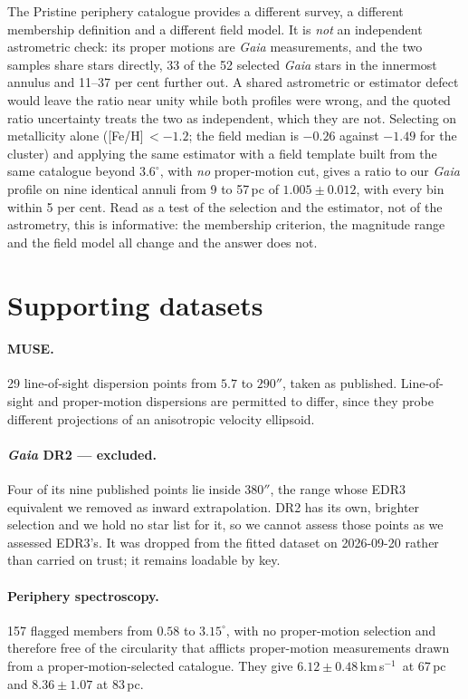 \documentclass[11pt,a4paper]{article}
\newcommand{\kms}{km\,s$^{-1}$}
\begin{document}
The Pristine periphery catalogue provides a different survey, a different membership
definition and a different field model. It is \emph{not} an independent astrometric check:
its proper motions are \emph{Gaia} measurements, and the two samples share stars directly,
33 of the 52 selected \emph{Gaia} stars in the innermost annulus and 11--37 per cent further
out. A shared astrometric or estimator defect would leave the ratio near unity while both
profiles were wrong, and the quoted ratio uncertainty treats the two as independent, which
they are not. Selecting on metallicity alone ([Fe/H]\,$<-1.2$;
the field median is $-0.26$ against $-1.49$ for the cluster) and applying the same estimator
with a field template built from the same catalogue beyond $3.6^\circ$, with \emph{no}
proper-motion cut, gives a ratio to our \emph{Gaia} profile on nine identical annuli from 9
to 57\,pc of $\mathbf{1.005\pm0.012}$, with every bin within 5 per cent. Read as a test of
the selection and the estimator, not of the astrometry, this is informative: the membership
criterion, the magnitude range and the field model all change and the answer does not.

\section{Supporting datasets}

\paragraph{MUSE.} 29 line-of-sight dispersion points from $5.7$ to $290''$, taken as
published. Line-of-sight and proper-motion dispersions are permitted to differ, since they
probe different projections of an anisotropic velocity ellipsoid.

\paragraph{\emph{Gaia} DR2 --- excluded.} Four of its nine published points
\citep{baumgardt2019} lie inside $380''$, the range whose EDR3 equivalent we removed as
inward extrapolation. DR2 has its own, brighter selection and we hold no star list for it,
so we cannot assess those points as we assessed EDR3's. It was dropped from the fitted
dataset on 2026-09-20 rather than carried on trust; it remains loadable by key.

\paragraph{Periphery spectroscopy.} 157 flagged members from $0.58$ to $3.15^\circ$, with no
proper-motion selection and therefore free of the circularity that afflicts proper-motion
measurements drawn from a proper-motion-selected catalogue. They give $6.12\pm0.48$\,\kms\ at
67\,pc and $8.36\pm1.07$ at 83\,pc.
\end{document}

